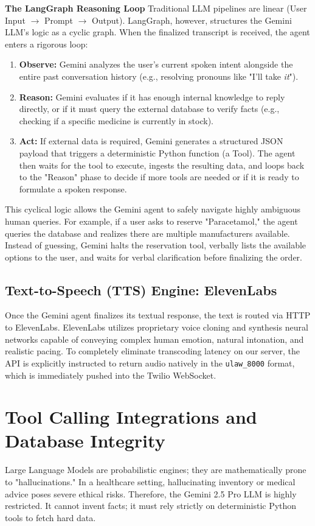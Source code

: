 \documentclass[conference]{IEEEtran}
\begin{document}
\textbf{The LangGraph Reasoning Loop}
Traditional LLM pipelines are linear (User Input $\rightarrow$ Prompt $\rightarrow$ Output). LangGraph, however, structures the Gemini LLM's logic as a cyclic graph. When the finalized transcript is received, the agent enters a rigorous loop:
\begin{enumerate}
    \item \textbf{Observe:} Gemini analyzes the user's current spoken intent alongside the entire past conversation history (e.g., resolving pronouns like "I'll take \textit{it}").
    \item \textbf{Reason:} Gemini evaluates if it has enough internal knowledge to reply directly, or if it must query the external database to verify facts (e.g., checking if a specific medicine is currently in stock).
    \item \textbf{Act:} If external data is required, Gemini generates a structured JSON payload that triggers a deterministic Python function (a Tool). The agent then waits for the tool to execute, ingests the resulting data, and loops back to the "Reason" phase to decide if more tools are needed or if it is ready to formulate a spoken response.
\end{enumerate}

This cyclical logic allows the Gemini agent to safely navigate highly ambiguous human queries. For example, if a user asks to reserve "Paracetamol," the agent queries the database and realizes there are multiple manufacturers available. Instead of guessing, Gemini halts the reservation tool, verbally lists the available options to the user, and waits for verbal clarification before finalizing the order.

\subsection{Text-to-Speech (TTS) Engine: ElevenLabs}
Once the Gemini agent finalizes its textual response, the text is routed via HTTP to ElevenLabs. ElevenLabs utilizes proprietary voice cloning and synthesis neural networks capable of conveying complex human emotion, natural intonation, and realistic pacing. To completely eliminate transcoding latency on our server, the API is explicitly instructed to return audio natively in the \texttt{ulaw\_8000} format, which is immediately pushed into the Twilio WebSocket.

\section{Tool Calling Integrations and Database Integrity}
Large Language Models are probabilistic engines; they are mathematically prone to "hallucinations." In a healthcare setting, hallucinating inventory or medical advice poses severe ethical risks. Therefore, the Gemini 2.5 Pro LLM is highly restricted. It cannot invent facts; it must rely strictly on deterministic Python tools to fetch hard data.
\end{document}

